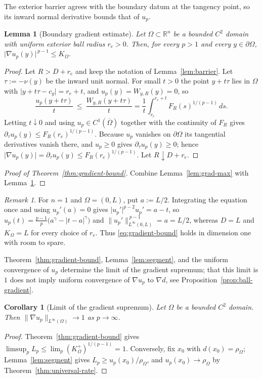 \documentclass[11pt]{article}
\newcommand{\R}{\mathbb R}
\newcommand{\abs}[1]{\lvert #1\rvert}
\newcommand{\norm}[1]{\lVert #1\rVert}
\newtheorem{lemma}[theorem]{Lemma}
\newtheorem{corollary}[theorem]{Corollary}
\theoremstyle{definition}
\theoremstyle{remark}
\newtheorem{remark}[theorem]{Remark}
\begin{document}
The exterior barrier agrees with the boundary datum at the tangency point, so
its inward normal derivative bounds that of $u_p$.
\begin{lemma}[Boundary gradient estimate]\label{lem:boundary-gradient}
Let $\Omega\subset\R^n$ be a bounded $C^2$ domain with uniform exterior ball
radius $r_e>0$. Then, for every $p>1$ and every $y\in\partial\Omega$,
$\abs{\nabla u_p(y)}^{\,p-1}\le K_\Omega$.
\end{lemma}
\begin{proof}
Let $R>D+r_e$ and keep the notation of Lemma~\ref{lem:barrier}. Let
$\tau:=-\nu(y)$ be the inward unit normal. For small $t>0$ the point $y+t\tau$
lies in $\Omega$ with $\abs{y+t\tau-c_y}=r_e+t$, and $u_p(y)=W_{y,R}(y)=0$, so
\[
\frac{u_p(y+t\tau)}{t}\ \le\ \frac{W_{y,R}(y+t\tau)}{t}
=\frac1t\int_{r_e}^{r_e+t}F_R(s)^{1/(p-1)}\,ds.
\]
Letting $t\downarrow0$ and using $u_p\in C^1(\overline\Omega)$ together with
the continuity of $F_R$ gives $\partial_\tau u_p(y)\le F_R(r_e)^{1/(p-1)}$.
Because $u_p$ vanishes on $\partial\Omega$ its tangential derivatives vanish
there, and $u_p\ge0$ gives $\partial_\tau u_p(y)\ge0$; hence
$\abs{\nabla u_p(y)}=\partial_\tau u_p(y)\le F_R(r_e)^{1/(p-1)}$. Let
$R\downarrow D+r_e$.
\end{proof}
\begin{proof}[Proof of Theorem~\ref{thm:gradient-bound}]
Combine Lemma~\ref{lem:grad-max} with Lemma~\ref{lem:boundary-gradient}.
\end{proof}

\begin{remark}\label{rem:1d}
For $n=1$ and $\Omega=(0,L)$, put $a:=L/2$. Integrating the equation once and
using $u_p'(a)=0$ gives $\abs{u_p'}^{p-2}u_p'=a-t$, so
$u_p(t)=\frac{p-1}{p}\bigl(a^{\gamma}-\abs{t-a}^{\gamma}\bigr)$ and
$\norm{u_p'}_{L^\infty(0,L)}^{\,p-1}=a=L/2$, whereas $D=L$ and
$K_\Omega=L$ for every choice of $r_e$. Thus \eqref{eq:gradient-bound} holds
in dimension one with room to spare.
\end{remark}

Theorem~\ref{thm:gradient-bound}, Lemma~\ref{lem:segment}, and the uniform
convergence of $u_p$ determine the limit of the gradient supremum; that this
limit is $1$ does not imply uniform convergence of $\nabla u_p$ to $\nabla d$,
see Proposition~\ref{prop:ball-gradient}.
\begin{corollary}[Limit of the gradient supremum]\label{cor:gradient-limit}
Let $\Omega$ be a bounded $C^2$ domain. Then
$\norm{\nabla u_p}_{L^\infty(\Omega)}\to1$ as $p\to\infty$.
\end{corollary}
\begin{proof}
Theorem~\ref{thm:gradient-bound} gives
$\limsup_pL_p\le\lim_p(K_\Omega^+)^{1/(p-1)}=1$. Conversely, fix $x_0$ with
$d(x_0)=\rho_\Omega$; Lemma~\ref{lem:segment} gives
$L_p\ge u_p(x_0)/\rho_\Omega$, and $u_p(x_0)\to\rho_\Omega$ by
Theorem~\ref{thm:universal-rate}.
\end{proof}
\end{document}

